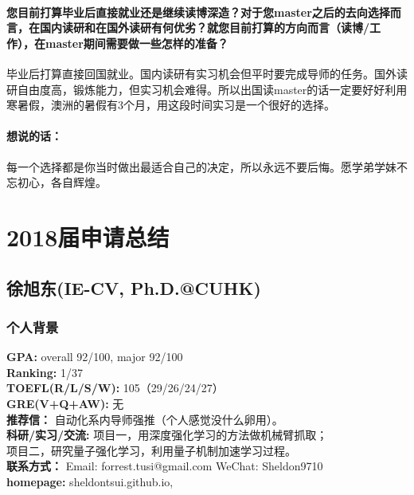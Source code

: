 \documentclass[a4paper,UTF8]{book}
\begin{document}
    \subsubsection*{您目前打算毕业后直接就业还是继续读博深造？对于您master之后的去向选择而言，在国内读研和在国外读研有何优劣？就您目前打算的方向而言（读博/工作），在master期间需要做一些怎样的准备？}
    毕业后打算直接回国就业。国内读研有实习机会但平时要完成导师的任务。国外读研自由度高，锻炼能力，但实习机会难得。所以出国读master的话一定要好好利用寒暑假，澳洲的暑假有3个月，用这段时间实习是一个很好的选择。

    \subsubsection{想说的话：}
    每一个选择都是你当时做出最适合自己的决定，所以永远不要后悔。愿学弟学妹不忘初心，各自辉煌。










\chapter{2018届申请总结}

\clearpage
\section{徐旭东(IE-CV, Ph.D.@CUHK)}
    \subsection*{个人背景}
        \textbf{GPA:} overall 92/100, major 92/100 \\
        \textbf{Ranking:} 1/37\\
        \textbf{TOEFL(R/L/S/W):} 105（29/26/24/27）\\
        \textbf{GRE(V+Q+AW):} 无\\
        \textbf{推荐信：} 自动化系内导师强推（个人感觉没什么卵用）。\\
        \textbf{科研/实习/交流:} 项目一，用深度强化学习的方法做机械臂抓取；\\ \qquad 项目二，研究量子强化学习，利用量子机制加速学习过程。\\ 
        \textbf{联系方式：} Email: forrest.tusi@gmail.com WeChat: Sheldon9710   \\
        \textbf{homepage: } sheldontsui.github.io, 
\end{document}
